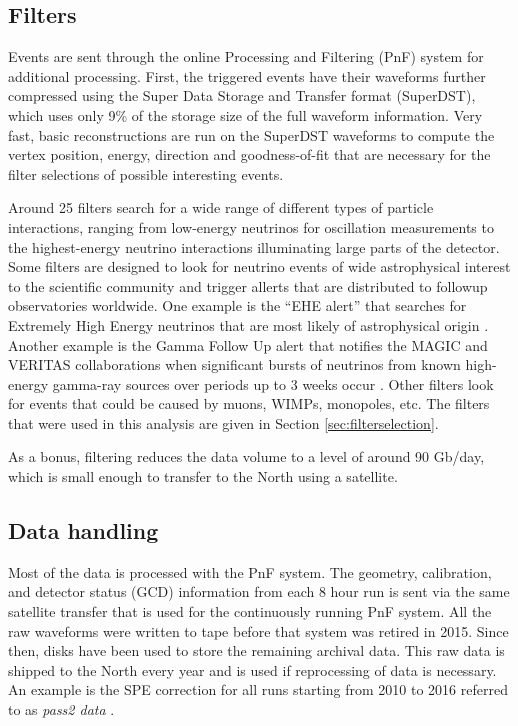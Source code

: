 \subsection{Filters}
\label{subsec:filters}
Events are sent through the online Processing and Filtering (PnF) system for additional processing. First, the triggered events have their waveforms further compressed using the Super Data Storage and Transfer format (SuperDST), which uses only 9\% of the storage size of the full waveform information. Very fast, basic reconstructions are run on the SuperDST waveforms to compute the vertex position, energy, direction and goodness-of-fit that are necessary for the filter selections of possible interesting events.

Around 25 filters search for a wide range of different types of particle interactions, ranging from low-energy neutrinos for oscillation measurements to the highest-energy neutrino interactions illuminating large parts of the detector. Some filters are designed to look for neutrino events of wide astrophysical interest to the scientific community and trigger allerts that are distributed to followup observatories worldwide. One example is the ``EHE alert'' that searches for Extremely High Energy neutrinos that are most likely of astrophysical origin \cite{Aartsen:2016lmt}. Another example is the Gamma Follow Up alert that notifies the MAGIC and VERITAS collaborations when significant bursts of neutrinos from known high-energy gamma-ray sources over periods up to 3 weeks occur \cite{1412973}. Other filters look for events that could be caused by muons, WIMPs, monopoles, etc. The filters that were used in this analysis are given in Section \ref{sec:filterselection}.

As a bonus, filtering reduces the data volume to a level of around 90 Gb/day, which is small enough to transfer to the North using a satellite.

\subsection{Data handling}
\label{subsec:datahandling}
Most of the data is processed with the PnF system. The geometry, calibration, and detector status (GCD) information from each 8 hour run is sent via the same satellite transfer that is used for the continuously running PnF system. All the raw waveforms were written to tape before that system was retired in 2015. Since then, disks have been used to store the remaining archival data. This raw data is shipped to the North every year and is used if reprocessing of data is necessary. An example is the SPE correction for all runs starting from 2010 to 2016 referred to as \textit{pass2 data} \cite{pass2}. \\

